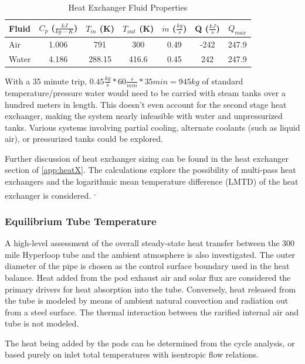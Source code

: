 \documentclass[heading.tex]{subfiles}
\begin{document}

\begin{table}
    \centering
    \caption{Heat Exchanger Fluid Properties}
    \label{tab:HeatEx}
    \begin{tabular}{l  c  c  c  c  c  c} 
        \hline
        Fluid & $C_{p}$ ($\frac{kJ}{kg-K}$)& $T_{in}$ (K) & $T_{out}$ (K) & $\dot{m}$ ($\frac{kg}{s}$) & Q ($\frac{kJ}{s}$) & $Q_{max}$\\ \hline 
        Air & 1.006 & 791 & 300 & 0.49 & -242 & 247.9\\ 
        Water & 4.186 & 288.15 & 416.6 &0.45 & 242 & 247.9\\ \hline
    \end{tabular}
\end{table}

With a 35 minute trip, $0.45 \frac{kg}{s} * 60 \frac{s}{min} * 35min = 945 kg$
of standard temperature/pressure water would need to be carried with steam tanks over a hundred meters in length.
This doesn't even account for the second stage heat exchanger, making the system nearly infeasible with water and unpressurized tanks.
Various systems involving partial cooling, alternate coolants (such as liquid air), or pressurized tanks could be explored.

Further discussion of heat exchanger sizing can be found in the heat exchanger section of \cref{app:heatX}.
The calculations explore the possibility of multi-pass heat exchangers
and the logarithmic mean temperature difference (LMTD) of the heat exchanger is considered.
\cite{Cengal}\textsuperscript{,}
\cite{Turns}


\subsubsection{Equilibrium Tube Temperature}
A high-level assessment of the overall steady-state heat transfer between the 300 mile Hyperloop tube and the ambient atmosphere is
also investigated. The outer diameter of the pipe is chosen as the control surface boundary used in the heat balance. Heat added from the pod exhaust
air and solar flux are considered the primary drivers for heat absorption into the tube. Conversely, heat released from the tube is modeled by means of
ambient natural convection and radiation out from a steel surface. The thermal interaction between the rarified internal air and
tube is not modeled.

The heat being added by the pods can be determined from the cycle analysis, or based purely on inlet total temperatures with isentropic
flow relations.
\end{document}
